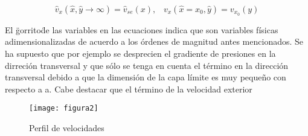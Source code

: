 \documentclass[11pt,a4paper]{article}
\begin{document}
\[\hat{v}_{x}(\hat{x},\hat{y}\rightarrow \infty)=\hat{v}_{se}(x), \;\;\; v_{x}(\hat{x}=x_{0},\hat{y})=v_{x_{0}}(y)\]

El \"gorrito\" de las variables en las ecuaciones indica que son variables físicas adimensionalizadas de acuerdo a los órdenes de magnitud antes mencionados. Se ha supuesto que por ejemplo se desprecien el gradiente de presiones en la dirreción transversal y que sólo se tenga en cuenta el término en la dirección transversal debido a que la dimensión de la capa límite es muy pequeño con respecto a a. Cabe destacar que el término de la velocidad exterior 

\begin{figure}[hb]
  \centering
  \texttt{[image: figura2]}
  \caption{Perfil de velocidades}
\end{figure}
\end{document}
